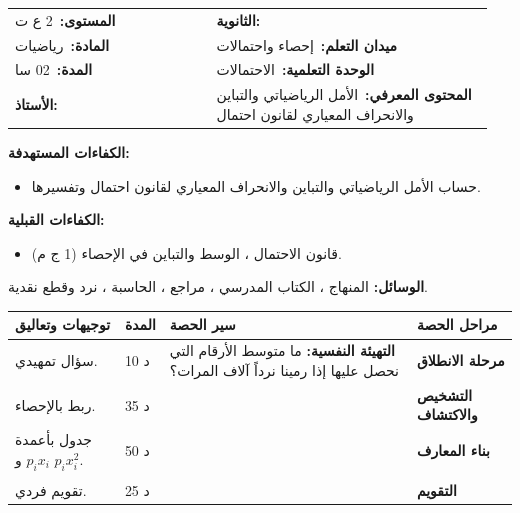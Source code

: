 \documentclass[12pt,a4paper]{article}
\makeatletter
\newenvironment{LTR}{\begin{otherlanguage}{english}}{\end{otherlanguage}}
\newcommand{\ar}[1]{\foreignlanguage{arabic}{#1}}
\renewcommand{\cdots}{\mathinner{\cdotp\cdotp\cdotp}}
\newcommand{\Phase}[1]{\textbf{#1}}
\newcommand{\Fld}[2]{\textbf{#1:}\ #2}
\newcommand{\ModhHead}[9]{%
\begin{LTR}
\begin{tcolorbox}[enhanced,colback=white,colframe=cThm!85!black,arc=4mm,boxrule=1pt,top=14pt,bottom=6pt,left=8pt,right=8pt,
 overlay={\node[fill=cThm!85!black,text=white,rounded corners=3mm,inner xsep=14pt,inner ysep=4pt,font=\large\bfseries] at ([yshift=0pt]frame.north){\ar{مذكرة رقم #1}};},
 before upper={\selectlanguage{arabic}}]
\begin{tabular}{@{}p{0.4\linewidth}p{0.55\linewidth}@{}}
\Fld{المستوى}{#2} & \Fld{الثانوية}{\dotfill}\\[3pt]
\Fld{المادة}{رياضيات} & \Fld{ميدان التعلم}{#3}\\[3pt]
\Fld{المدة}{#5} & \Fld{الوحدة التعلمية}{#4}\\[3pt]
\Fld{الأستاذ}{\dotfill} & \Fld{المحتوى المعرفي}{#6}\\
\end{tabular}
\end{tcolorbox}
\begin{tcolorbox}[enhanced,colback=white,colframe=cThm!85!black,arc=3mm,boxrule=0.8pt,sidebyside,sidebyside align=top,lefthand ratio=0.5,
 segmentation style={dashed,cThm!60},before upper={\selectlanguage{arabic}},before lower={\selectlanguage{arabic}}]
\textbf{الكفاءات المستهدفة:}\par #8
\tcblower
\textbf{الكفاءات القبلية:}\par #7
\end{tcolorbox}
\end{LTR}
\par\smallskip\textbf{الوسائل:} #9\par\smallskip}
\newenvironment{Sayr}{%
\begin{LTR}\renewcommand{\arraystretch}{1.25}
\begin{longtable}{|p{0.17\textwidth}|>{\centering\arraybackslash}p{0.06\textwidth}|p{0.53\textwidth}|>{\centering\arraybackslash}p{0.12\textwidth}|}
\hline\rowcolor{cThm!12}\ar{\textbf{توجيهات وتعاليق}} & \ar{\textbf{المدة}} & \ar{\textbf{سير الحصة}} & \ar{\textbf{مراحل الحصة}}\\\hline\endhead
\hline\endfoot}{\end{longtable}\end{LTR}}
\newcommand{\Row}[4]{\ar{\small #4} & \ar{#3} & \ar{#2} & \cellcolor{cThm!8}\ar{\Phase{#1}}\\\hline}
\newcommand{\Lab}[2]{\foreignlanguage{english}{\tcbox[on line,colback=#1,colframe=#1,boxrule=0pt,arc=2pt,boxsep=1pt,left=5pt,right=5pt,top=1pt,bottom=1pt]{\ar{\textcolor{white}{\textbf{#2}}}}}}
\newcommand{\ck}{\ensuremath{{\color{cRem}\checkmark}}}
\makeatother
\begin{document}
\newpage
\ModhHead{21}{2 ع ت}{إحصاء واحتمالات}{الاحتمالات}{02 سا}{الأمل الرياضياتي والتباين والانحراف المعياري لقانون احتمال}%
{\begin{itemize}\item قانون الاحتمال ، الوسط والتباين في الإحصاء (1 ج م).\end{itemize}}%
{\begin{itemize}\item حساب الأمل الرياضياتي والتباين والانحراف المعياري لقانون احتمال وتفسيرها.\end{itemize}}%
{المنهاج ، الكتاب المدرسي ، مراجع ، الحاسبة ، نرد وقطع نقدية.}
\begin{Sayr}
\Row{مرحلة الانطلاق}{%
\textbf{التهيئة النفسية:} ما متوسط الأرقام التي نحصل عليها إذا رمينا نرداً آلاف المرات؟}{10 د}{سؤال تمهيدي.}
\Row{التشخيص والاكتشاف}{%
\Lab{cEx}{وضعية مقترحة}\par\ck\ نستعمل نتائج المحاكاة (المذكرة 18): الوسط الحسابي للأرقام يقترب من $3{,}5$.\par
\ck\ نحسب $\sum p_ix_i$ بقانون النرد: نجد $3{,}5$. الاحتمالات تلعب دور التواترات.\par
}{35 د}{ربط بالإحصاء.}
\Row{بناء المعارف}{%
\Lab{cDef}{تعريف}\ قانون احتمال $(x_i;p_i)_{1\leqslant i\leqslant n}$ (المخارج أعداد):\par\ck\ \textbf{الأمل الرياضياتي}: $\mu=\sum p_ix_i$.\par
\ck\ \textbf{التباين}: $V=\sum p_ix_i^2-\mu^2$ ؛ \textbf{الانحراف المعياري}: $\sigma=\sqrt V$.\par
\Lab{cEx}{النرد المتوازن}\ $\mu=\dfrac{1+2+\cdots+6}6=3{,}5$ ؛ $V=\dfrac{91}6-3{,}5^2=\dfrac{35}{12}$ ؛ $\sigma\approx1{,}71$.\par}{50 د}{جدول بأعمدة $p_ix_i$ و $p_ix_i^2$.}
\Row{}{%
\Lab{cRem}{ملاحظات}\ $\mu$ «القيمة المتوسطة» على عدد كبير من التكرارات ، و $\sigma$ يقيس التشتت حولها.\par\Lab{cThm!80!black}{حذار}\ نتحقق أولاً أن مجموع الاحتمالات يساوي $1$.}{}{}
\Row{التقويم}{%
\Lab{cEx}{تطبيق}\par قانون احتمال: $x_i$: $0$ ، $1$ ، $2$ باحتمالات $0{,}5$ ، $0{,}3$ ، $0{,}2$. احسب $\mu$ و $V$.\par\textbf{الحل:} $\mu=0{,}3+0{,}4=0{,}7$ ؛ $\sum p_ix_i^2=0{,}3+0{,}8=1{,}1$ ؛ $V=1{,}1-0{,}49=0{,}61$ ، $\sigma\approx0{,}78$.\par\textbf{واجب منزلي:} تمرينا 42 و 43 من باب الاحتمالات.\par\smallskip\textbf{ملاحظات حول سير الحصة:} \dotfill}{25 د}{تقويم فردي.}
\end{Sayr}
\end{document}
